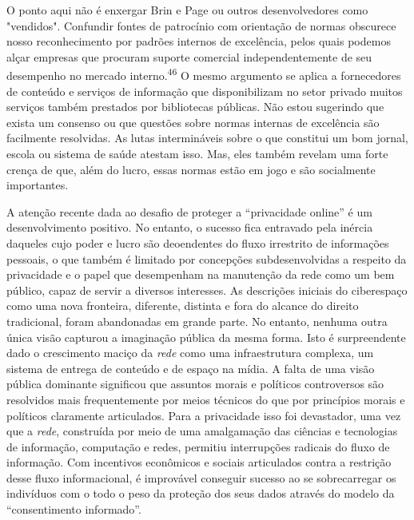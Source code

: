 O ponto aqui não é enxergar Brin e Page ou outros desenvolvedores como
"vendidos". Confundir fontes de patrocínio com orientação de normas
obscurece nosso reconhecimento por padrões internos de excelência, pelos
quais podemos alçar empresas que procuram suporte comercial
independentemente de seu desempenho no mercado
interno.\textsuperscript{{46}} O mesmo argumento se aplica a
fornecedores de conteúdo e serviços de informação que disponibilizam no
setor privado muitos serviços também prestados por bibliotecas públicas.
Não estou sugerindo que exista um consenso ou que questões sobre normas
internas de excelência são facilmente resolvidas. As lutas intermináveis
sobre o que constitui um bom jornal, escola ou sistema de saúde atestam
isso. Mas, eles também revelam uma forte crença de que, além do lucro,
essas normas estão em jogo e são socialmente importantes.

A atenção recente dada ao desafio de proteger a ``privacidade online'' é
um desenvolvimento positivo. No entanto, o sucesso fica entravado pela
inércia daqueles cujo poder e lucro são deoendentes do fluxo irrestrito
de informações pessoais, o que também é limitado por concepções
subdesenvolvidas a respeito da privacidade e o papel que desempenham na
manutenção da rede como um bem público, capaz de servir a diversos
interesses. As descrições iniciais do ciberespaço como uma nova
fronteira, diferente, distinta e fora do alcance do direito tradicional,
foram abandonadas em grande parte. No entanto, nenhuma outra única visão
capturou a imaginação pública da mesma forma. Isto é surpreendente dado
o crescimento maciço da \emph{rede} como uma infraestrutura complexa, um
sistema de entrega de conteúdo e de espaço na mídia. A falta de uma
visão pública dominante significou que assuntos morais e políticos
controversos são resolvidos mais frequentemente por meios técnicos do
que por princípios morais e políticos claramente articulados. Para a
privacidade isso foi devastador, uma vez que a \emph{rede}, construída
por meio de uma amalgamação das ciências e tecnologias de informação,
computação e redes, permitiu interrupções radicais do fluxo de
informação. Com incentivos econômicos e sociais articulados contra a
restrição desse fluxo informacional, é improvável conseguir sucesso ao
se sobrecarregar os indivíduos com o todo o peso da proteção dos seus
dados através do modelo da ``consentimento informado''.

